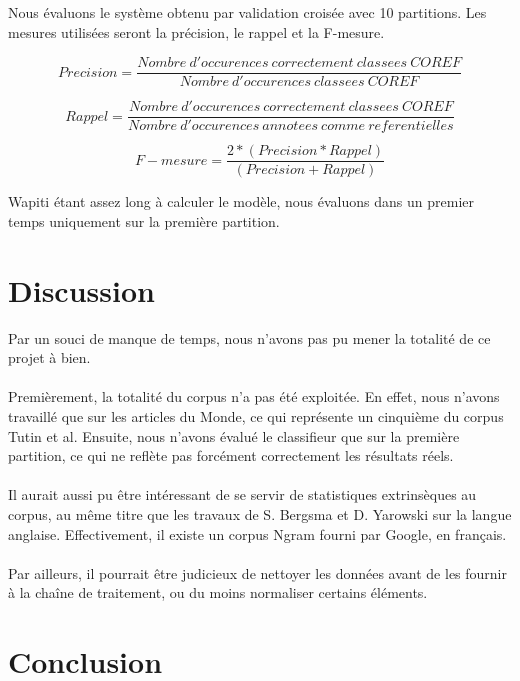\documentclass[a4paper,12pt]{article}
\begin{document}
Nous évaluons le système obtenu par validation croisée avec 10 partitions. Les mesures utilisées seront la précision, le rappel et la F-mesure.

\[ Precision = \frac{Nombre\ d'occurences\ correctement\ classees\ COREF}{Nombre\ d'occurences\ classees\ COREF} \]

\[ Rappel = \frac{Nombre\ d'occurences\ correctement\ classees\ COREF}{Nombre\ d'occurences\ annotees\ comme\ referentielles} \]

\[ F-mesure = \frac{2 * (Precision * Rappel)}{(Precision + Rappel)} \]

Wapiti étant assez long à calculer le modèle, nous évaluons dans un premier temps uniquement sur la première partition.


\section{Discussion}

Par un souci de manque de temps, nous n'avons pas pu mener la totalité de ce projet à bien.

\paragraph{}
Premièrement, la totalité du corpus n'a pas été exploitée. En effet, nous n'avons travaillé que sur les articles du Monde, ce qui représente un cinquième du corpus Tutin et al. Ensuite, nous n'avons évalué le classifieur que sur la première partition, ce qui ne reflète pas forcément correctement les résultats réels.

\paragraph{}
Il aurait aussi pu être intéressant de se servir de statistiques extrinsèques au corpus, au même titre que les travaux de S. Bergsma et D. Yarowski sur la langue anglaise. Effectivement, il existe un corpus Ngram fourni par Google, en français.

\paragraph{}
Par ailleurs, il pourrait être judicieux de nettoyer les données avant de les fournir à la chaîne de traitement, ou du moins normaliser certains éléments.



\section*{Conclusion}
\end{document}
